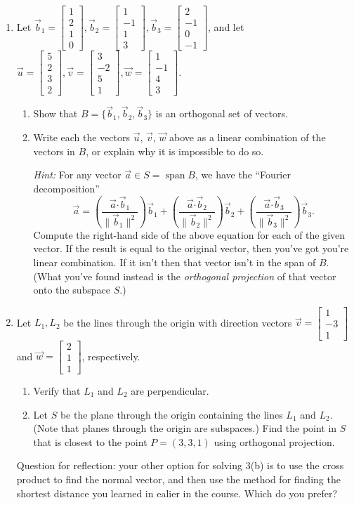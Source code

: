 \documentclass[12pt]{article}
\newcommand{\len}[1]{\lVert #1\rVert}
\newcommand{\dotp}{\boldsymbol{\cdot}}
\newcommand{\bbm}{\begin{bmatrix}}
\newcommand{\ebm}{\end{bmatrix}}
\begin{document}
\begin{enumerate}
 \item Let $\vec{b}_1= \bbm 1\\2\\1\\0\ebm, \vec{b}_2 =  \bbm 1\\-1\\1\\3\ebm, \vec{b}_3 =  \bbm 2\\-1\\0\\-1\ebm$, and let $\vec{u} = \bbm 5\\2\\3\\2\ebm, \vec{v} = \bbm 3\\-2\\5\\1\ebm, \vec{w} = \bbm 1\\-1\\4\\3\ebm$.
\begin{enumerate}
 \item Show that $B=\{\vec{b}_1,\vec{b}_2,\vec{b}_3\}$ is an orthogonal set of vectors.
 
\bigskip

 \item Write each the vectors $\vec{u}$, $\vec{v}$, $\vec{w}$ above as a linear combination of the vectors in $B$, or explain why it is impossible to do so.

\textit{Hint:} For any vector $\vec{a} \in S = \operatorname{span}B$, we have the ``Fourier decomposition''
\[
 \vec{a} = \left(\frac{\vec{a}\dotp \vec{b}_1}{\len{\vec{b}_1}^2}\right)\vec{b}_1+\left(\frac{\vec{a}\dotp \vec{b}_2}{\len{\vec{b}_2}^2}\right)\vec{b}_2+\left(\frac{\vec{a}\dotp \vec{b}_3}{\len{\vec{b}_3}^2}\right)\vec{b}_3.
\]
Compute the right-hand side of the above equation for each of the given vector. If the result is equal to the original vector, then you've got you're linear combination. If it isn't then that vector isn't in the span of $B$. (What you've found instead is the \textit{orthogonal projection} of that vector onto the subspace $S$.)
\end{enumerate}
\item Let $L_1, L_2$ be the lines through the origin with direction vectors $\vec{v} = \bbm 1\\-3\\1\ebm$ and $\vec{w} = \bbm 2\\1\\1\ebm$, respectively. 
\begin{enumerate}
 \item Verify that $L_1$ and $L_2$ are perpendicular.
 \item Let $S$ be the plane through the origin containing the lines $L_1$ and $L_2$. (Note that planes through the origin are subspaces.) Find the point in $S$ that is closest to the point $P=(3,3,1)$ using orthogonal projection. 
\end{enumerate}
Question for reflection: your other option for solving 3(b) is to use the cross product to find the normal vector, and then use the method for finding the shortest distance you learned in ealier in the course. Which do you prefer?


\end{enumerate}
\end{document}
